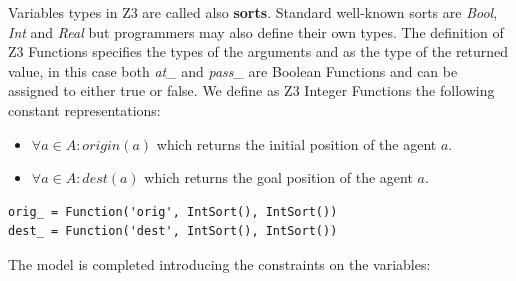 \documentclass[12pt, a4paper, hidelinks]{article}
\numberwithin{equation}{section}
\begin{document}
Variables types in Z3 are called also \textbf{sorts}.
Standard well-known sorts are \textit{Bool}, \textit{Int} and \textit{Real} but programmers may also define their own types.
The definition of Z3 Functions specifies the types of the arguments and as the type of the returned value, in this case both \textit{at\_} and \textit{pass\_} are Boolean Functions and can be assigned to either true or false.
We define as Z3 Integer Functions the following constant representations:

\begin{itemize}
\item $\forall a \in A : origin(a)$ which returns the initial position of the agent $a$.
\item $\forall a \in A : dest(a)$ which returns the goal position of the agent $a$.
\end{itemize}

\begin{lstlisting}[label={lst:origdest}]
orig_ = Function('orig', IntSort(), IntSort())
dest_ = Function('dest', IntSort(), IntSort())
\end{lstlisting}

The model is completed introducing the constraints on the variables:
\end{document}
